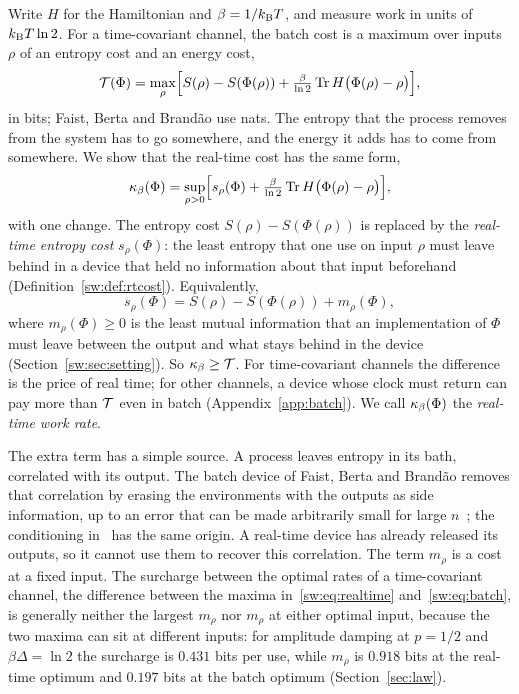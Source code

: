 Write $H$ for the Hamiltonian and $\beta=1/k_{\mathrm B} T$, and measure work in units of $k_{\mathrm B} T\ln2$. For a time-covariant channel, the batch cost is a maximum over inputs $\rho$ of an entropy cost and an energy cost,
\begin{equation}\label{sw:eq:batch}
  \mathcal T(\Phi)=\max_\rho\Bigl[S(\rho)-S(\Phi(\rho))+\tfrac{\beta}{\ln 2}\operatorname{Tr} H\bigl(\Phi(\rho)-\rho\bigr)\Bigr],
\end{equation}
in bits; Faist, Berta and Brand\~ao use nats. The entropy that the process removes from the system has to go somewhere, and the energy it adds has to come from somewhere. We show that the real-time cost has the same form,
\begin{equation}\label{sw:eq:realtime}
  \kappa_\beta(\Phi)=\sup_{\rho>0}\Bigl[s_\rho(\Phi)+\tfrac{\beta}{\ln 2}\operatorname{Tr} H\bigl(\Phi(\rho)-\rho\bigr)\Bigr],
\end{equation}
with one change. The entropy cost $S(\rho)-S(\Phi(\rho))$ is replaced by the \emph{real-time entropy cost} $s_\rho(\Phi)$: the least entropy that one use on input $\rho$ must leave behind in a device that held no information about that input beforehand (Definition~\ref{sw:def:rtcost}). Equivalently,
\begin{equation}\label{sw:eq:mutual}
  s_\rho(\Phi)=S(\rho)-S(\Phi(\rho))+m_\rho(\Phi),
\end{equation}
where $m_\rho(\Phi)\ge0$ is the least mutual information that an implementation of $\Phi$ must leave between the output and what stays behind in the device (Section~\ref{sw:sec:setting}). So $\kappa_\beta\ge\mathcal T$. For time-covariant channels the difference is the price of real time; for other channels, a device whose clock must return can pay more than $\mathcal T$ even in batch (Appendix~\ref{app:batch}). We call $\kappa_\beta(\Phi)$ the \emph{real-time work rate}.

The extra term has a simple source. A process leaves entropy in its bath, correlated with its output. The batch device of Faist, Berta and Brand\~ao removes that correlation by erasing the environments with the outputs as side information, up to an error that can be made arbitrarily small for large $n$~\cite[Thm.~7.1]{FBB21}; the conditioning in~\cite{FDOR15} has the same origin. A real-time device has already released its outputs, so it cannot use them to recover this correlation. The term $m_\rho$ is a cost at a fixed input. The surcharge between the optimal rates of a time-covariant channel, the difference between the maxima in~\eqref{sw:eq:realtime} and~\eqref{sw:eq:batch}, is generally neither the largest $m_\rho$ nor $m_\rho$ at either optimal input, because the two maxima can sit at different inputs: for amplitude damping at $p=1/2$ and $\beta\Delta=\ln2$ the surcharge is $0.431$ bits per use, while $m_\rho$ is $0.918$ bits at the real-time optimum and $0.197$ bits at the batch optimum (Section~\ref{sec:law}).

